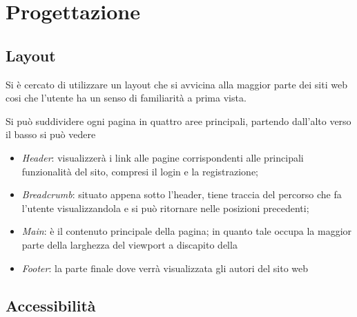 \section{Progettazione}

\subsection{Layout}

Si è cercato di utilizzare un layout che si avvicina alla maggior parte dei 
siti web cosi che l'utente ha un senso di familiarità a prima vista.

Si può suddividere ogni pagina in quattro aree principali, 
partendo dall'alto verso il basso si può vedere

\begin{itemize}
	\item \textit{Header}:  visualizzerà i link alle pagine
	corrispondenti alle principali funzionalità del sito, compresi il login e la registrazione;
	\item \textit{Breadcrumb}: situato appena sotto l'header, tiene traccia del 
	percorso che fa l'utente visualizzandola e si può ritornare nelle posizioni precedenti;
	\item \textit{Main}: è il contenuto principale della pagina; in quanto
	tale occupa la maggior parte della larghezza del viewport a discapito
	della
	\item \textit{Footer}: la parte finale dove verrà visualizzata gli autori del sito web
\end{itemize}

\subsection{Accessibilità}
